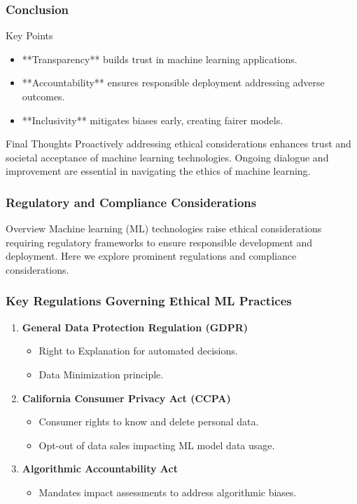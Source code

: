 \documentclass[aspectratio=169]{beamer}
\begin{document}
\begin{frame}[fragile]
    \frametitle{Conclusion}
    \begin{block}{Key Points}
        \begin{itemize}
            \item **Transparency** builds trust in machine learning applications.
            \item **Accountability** ensures responsible deployment addressing adverse outcomes.
            \item **Inclusivity** mitigates biases early, creating fairer models.
        \end{itemize}
    \end{block}
    \begin{block}{Final Thoughts}
        Proactively addressing ethical considerations enhances trust and societal acceptance of machine learning technologies. Ongoing dialogue and improvement are essential in navigating the ethics of machine learning.
    \end{block}
\end{frame}

\begin{frame}[fragile]
    \frametitle{Regulatory and Compliance Considerations}
    \begin{block}{Overview}
        Machine learning (ML) technologies raise ethical considerations requiring regulatory frameworks to ensure responsible development and deployment. Here we explore prominent regulations and compliance considerations.
    \end{block}
\end{frame}

\begin{frame}[fragile]
    \frametitle{Key Regulations Governing Ethical ML Practices}
    \begin{enumerate}
        \item \textbf{General Data Protection Regulation (GDPR)}
        \begin{itemize}
            \item Right to Explanation for automated decisions.
            \item Data Minimization principle.
        \end{itemize}
        \item \textbf{California Consumer Privacy Act (CCPA)}
        \begin{itemize}
            \item Consumer rights to know and delete personal data.
            \item Opt-out of data sales impacting ML model data usage.
        \end{itemize}
        \item \textbf{Algorithmic Accountability Act}
        \begin{itemize}
            \item Mandates impact assessments to address algorithmic biases.
        \end{itemize}
    \end{enumerate}
\end{frame}
\end{document}
